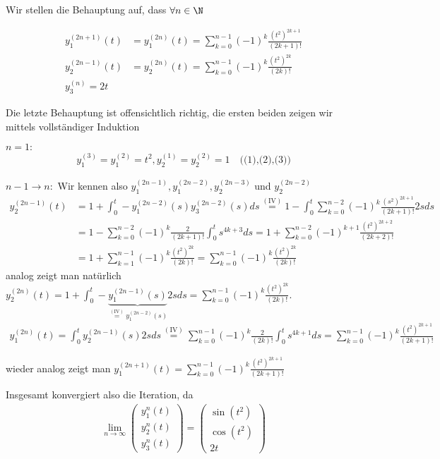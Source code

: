 \begin{solution}
Wir stellen die Behauptung auf, dass $\forall n \in \N$

\begin{align*}
    y_{1}^{(2n+1)}(t) &= y_{1}^{(2n)}(t) = \sum_{k=0}^{n-1}(-1)^{k}\frac{(t^{2})^{2k+1}}{(2k+1)!} \\
    y_{2}^{(2n-1)}(t) &= y_{2}^{(2n)}(t) = \sum_{k=0}^{n-1}(-1)^{k}\frac{(t^{2})^{2k}}{(2k)!} \\
    y_{3}^{(n)}=2t
\end{align*}

Die letzte Behauptung ist offensichtlich richtig, die ersten beiden zeigen wir mittels vollständiger Induktion

$n = 1:$
\begin{align*}
     y_{1}^{(3)} = y_{1}^{(2)} = t^{2}, y_{2}^{(1)} = y_{2}^{(2)} = 1 \text{~~~((1),(2),(3))}
\end{align*}

$n-1 \to n:$
Wir kennen also $y_{1}^{(2n-1)},y_{1}^{(2n-2)},y_{2}^{(2n-3)}$ und $y_{2}^{(2n-2)}$
\begin{align*}
    y_{2}^{(2n-1)}(t) &= 1 + \int_{0}^{t}-y_{1}^{(2n-2)}(s)y_{3}^{(2n-2)}(s)ds \stackrel{(\text{IV})}{=} 1 - \int_{0}^{t}\sum_{k=0}^{n-2}(-1)^{k} \frac{(s^{2})^{2k+1}}{(2k+1)!}2sds \\
    &= 1 - \sum_{k=0}^{n-2}(-1)^{k} \frac{2}{(2k+1)!} \int_{0}^{t}s^{4k+3}ds = 1 + \sum_{k=0}^{n-2}(-1)^{k+1} \frac{(t^{2})^{2k+2}}{(2k+2)!} \\
    &= 1 + \sum_{k=1}^{n-1}(-1)^{k} \frac{(t^{2})^{2k}}{(2k)!} = \sum_{k=0}^{n-1}(-1)^{k} \frac{(t^{2})^{2k}}{(2k)!}
\end{align*}
analog zeigt man natürlich $y_{2}^{(2n)}(t)=1 + \int_{0}^{t}-\underbrace{y_{1}^{(2n-1)}(s)}_{\stackrel{(\text{IV})}{=}y_{1}^{(2n-2)}(s)}2sds = \sum_{k=0}^{n-1}(-1)^{k} \frac{(t^{2})^{2k}}{(2k)!} $.
\newline
\begin{align*}
    y_{1}^{(2n)}(t) =\int_{0}^{t}y_{2}^{(2n-1)}(s)2sds \stackrel{(\text{IV})}{=} \sum_{k=0}^{n-1}(-1)^{k} \frac{2}{(2k)!} \int_{0}^{t}s^{4k+1}ds = \sum_{k=0}^{n-1}(-1)^{k} \frac{(t^{2})^{2k+1}}{(2k+1)!}
\end{align*}

wieder analog zeigt man $y_{1}^{(2n+1)}(t) = \sum_{k=0}^{n-1}(-1)^{k} \frac{(t^{2})^{2k+1}}{(2k+1)!}$

Insgesamt konvergiert also die Iteration, da
\begin{align*}
    \lim_{n \to \infty} \begin{pmatrix}
        y_{1}^{n}(t) \\ y_{2}^{n}(t) \\ y_{3}^{n}(t)
     \end{pmatrix} =
     \begin{pmatrix}
        \sin(t^{2}) \\ \cos(t^{2}) \\ 2t
    \end{pmatrix}
\end{align*}

\end{solution}

